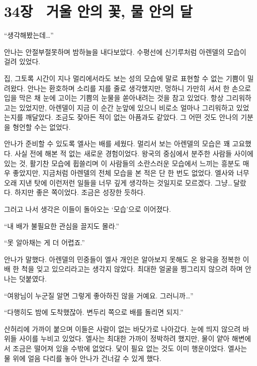 

\chapter[34장  거울 안의 꽃, 물 안의 달][34장\hspace*{.5em}거울 안의 꽃, 물 안의 달]{34장 \ 거울 안의 꽃, 물 안의 달}



\forceindent``생각해봤는데\ldots''

안나는 안절부절못하며 밤하늘을 내다보았다. 수평선에 신기루처럼 아렌델의 모습이 걸려 있었다.

집, 그토록 시간이 지나 멀리에서라도 보는 성의 모습에 말로 표현할 수 없는 기쁨이 밀려왔다. 안나는 환호하며 소리를 지를 줄로 생각했지만, 멍하니 가만히 서서 한 손으로 입을 막은 채 눈에 고이는 기쁨의 눈물을 쏟아내려는 것을 참고 있었다. 항상 그리워하고는 있었지만, 아렌델이 지금 이 순간 눈앞에 있으니 비로소 얼마나 그리워하고 있었는지를 깨달았다. 조금도 잦아든 적이 없는 아픔과도 같았다. 그 어떤 것도 안나의 기분을 형언할 수는 없었다.

안나가 준비할 수 있도록 엘사는 배를 세웠다. 멀리서 보는 아렌델의 모습은 꽤 고요했다. 사실 전에 해본 적 없는 새로운 경험이었다. 왕국의 중심에서 분주한 사람들 사이에 있는 것, 활기찬 모습에 휩쓸리며 이 사람들의 소란스러운 모습에서 느끼는 흥분도 매우 좋았지만, 지금처럼 아렌델의 전체 모습을 본 적은 단 한 번도 없었다. 엘사와 너무 오래 지낸 탓에 이런저런 일들을 너무 깊게 생각하는 것일지로 모르겠다. 그냥\ldots\,달랐다. 하지만 좋은 쪽이었다. 조금은 성장한 듯하다.

그러고 나서 생각은 이들이 돌아오는 `모습'으로 이어졌다.

``내 배가 불필요한 관심을 끌지도 몰라.''

``못 알아채는 게 더 어렵죠.''

안나가 말했다. 아렌델의 민중들이 엘사 개인은 알아보지 못해도 온 왕국을 정복한 이 배 한 척을 잊고 있으리라고는 생각지 않았다. 최대한 얼굴을 찡그리지 않으려 하며 안나는 덧붙였다.

``여왕님이 누군질 알면 그렇게 좋아하진 않을 거예요. 그러니까\ldots''

``다행히도 밤에 도착했잖아. 변두리 쪽으로 배를 돌리면 되지.''

산허리에 가까이 붙으며 이들은 사람이 없는 바닷가로 나아갔다. 눈에 띄지 않으려 바위들 사이를 누비고 있었다. 엘사는 최대한 가까이 정박하려 했지만, 물이 얕아 해변에서 조금은 떨어져 있을 수밖에 없었다. 닻이 필요 없는 것도 이미 행운이었다. 엘사는 물 위에 얼음 다리를 놓아 안나가 건너갈 수 있게 했다.

